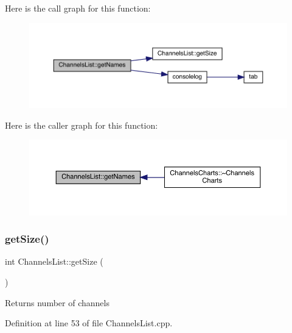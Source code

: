 Here is the call graph for this function\+:
\nopagebreak
\begin{figure}[H]
\begin{center}
\leavevmode
\includegraphics[width=350pt]{class_channels_list_a17482d918a0dbbd4bf0fc2a22ee67668_cgraph}
\end{center}
\end{figure}
Here is the caller graph for this function\+:
\nopagebreak
\begin{figure}[H]
\begin{center}
\leavevmode
\includegraphics[width=350pt]{class_channels_list_a17482d918a0dbbd4bf0fc2a22ee67668_icgraph}
\end{center}
\end{figure}
\mbox{\label{class_channels_list_aeaeb08c6bf8aa1a48b5cc52c56505408}} 
\subsubsection{\texorpdfstring{get\+Size()}{getSize()}}
{\footnotesize\ttfamily int Channels\+List\+::get\+Size (\begin{DoxyParamCaption}{ }\end{DoxyParamCaption})}

\begin{DoxyReturn}{Returns}
number of channels 
\end{DoxyReturn}


Definition at line 53 of file Channels\+List.\+cpp.

